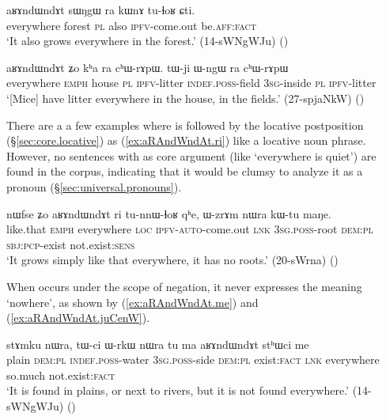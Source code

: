  \begin{exe}
\ex \label{ex:aRAndWndAt.Zo.loc}
\gll  aʁɤndɯndɤt sɯŋgɯ ra kɯnɤ tu-ɬoʁ ɕti. \\
everywhere forest \textsc{pl} also \textsc{ipfv}-come.out be.\textsc{aff}:\textsc{fact} \\
\glt `It also grows everywhere in the forest.' (14-sWNgWJu)
()
\end{exe} 

 \begin{exe}
\ex \label{ex:aRAndWndAt.Zo.loc2}
\gll  aʁɤndɯndɤt ʑo kʰa ra cʰɯ-rɤpɯ. tɯ-ji ɯ-ngɯ ra cʰɯ-rɤpɯ \\
everywhere \textsc{emph} house \textsc{pl} \textsc{ipfv}-litter \textsc{indef}.\textsc{poss}-field \textsc{3sg}-inside \textsc{pl} \textsc{ipfv}-litter \\
\glt `[Mice] have litter everywhere in the house, in the fields.' (27-spjaNkW)
()
\end{exe} 

There are a a few examples where  is followed  by the locative postposition  (§\ref{sec:core.locative}) as (\ref{ex:aRAndWndAt.ri}) like a locative noun phrase. However, no sentences with  as core argument (like `everywhere is quiet') are found in the corpus, indicating that it would be clumsy to analyze it as a pronoun (§\ref{sec:universal.pronouns}).

 \begin{exe}
\ex \label{ex:aRAndWndAt.ri}
\gll nɯfse ʑo aʁɤndɯndɤt ri tu-nnɯ-ɬoʁ qʰe, ɯ-zrɤm nɯra kɯ-tu maŋe. \\
like.that \textsc{emph} everywhere \textsc{loc} \textsc{ipfv}-\textsc{auto}-come.out \textsc{lnk} \textsc{3sg}.\textsc{poss}-root \textsc{dem}:\textsc{pl} \textsc{sbj}:\textsc{pcp}-exist not.exist:\textsc{sens} \\
\glt `It grows simply like that everywhere, it has no roots.' (20-sWrna)
()
\end{exe} 

When  occurs under the scope of negation, it never expresses the meaning `nowhere', as shown by (\ref{ex:aRAndWndAt.me}) and (\ref{ex:aRAndWndAt.juCenW}).

\begin{exe}
\ex \label{ex:aRAndWndAt.me}
\gll stɤmku nɯra, tɯ-ci ɯ-rkɯ nɯra tu ma aʁɤndɯndɤt stʰɯci me \\
plain \textsc{dem}:\textsc{pl} \textsc{indef}.\textsc{poss}-water \textsc{3sg}.\textsc{poss}-side  \textsc{dem}:\textsc{pl} exist:\textsc{fact} \textsc{lnk} everywhere so.much not.exist:\textsc{fact} \\
\glt `It is found in plains, or next to rivers, but it is not found everywhere.' (14-sWNgWJu)
()
\end{exe} 

